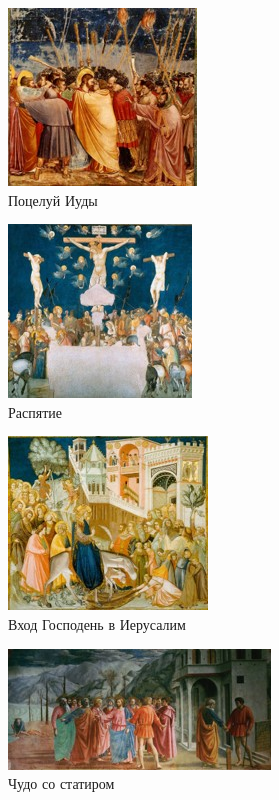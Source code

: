 

\begin{figure}[ht]
    \centering
    \includegraphics{img/italiy/1.jpg}
    \caption{Поцелуй Иуды}\label{fig:italy:1}
\end{figure}

\begin{figure}[ht]
    \centering
    \includegraphics{img/italiy/2.jpg}
    \caption{Распятие}\label{fig:italy:2}
\end{figure}

\begin{figure}[ht]
    \centering
    \includegraphics{img/italiy/3.jpg}
    \caption{Вход Господень в Иерусалим}\label{fig:italy:3}
\end{figure}

\begin{figure}[ht]
    \centering
    \includegraphics{img/italiy/4.jpg}
    \caption{Чудо со статиром}\label{fig:italy:4}
\end{figure}

